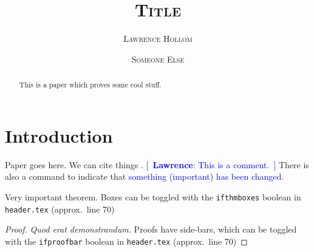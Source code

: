 \documentclass[reqno,a4paper,11pt]{article}
\newcommand{\lhc}[1]{\textcolor{blue}{[~\textbf{Lawrence}: #1~]}}
\newcommand{\lh}[1]{\textcolor{blue}{#1}}
\begin{document}
\title{\textsc{\bfseries Title}}

\renewcommand{\thefootnote}{\fnsymbol{footnote}}

\author{\textsc{Lawrence Hollom}\footnotemark[1] \and \textsc{Someone Else}\footnotemark[2]}


\renewcommand{\thefootnote}{\arabic{footnote}}

\date{}

\maketitle

\begin{abstract}
  This is a paper which proves some cool stuff.
\end{abstract}



\section{Introduction}
\label{sec:intro}

Paper goes here.
We can cite things \cite{Euc00}.
\lhc{This is a comment.}
There is also a command to indicate that \lh{something (important) has been changed}.

\begin{theorem}
	Very important theorem. Boxes can be toggled with the \texttt{ifthmboxes} boolean in \texttt{header.tex} (approx.\ line 70)
\end{theorem}

\begin{proof}
	\textit{Quod erat demonstrandum.} Proofs have side-bars, which can be toggled with the \texttt{ifproofbar} boolean in \texttt{header.tex} (approx.\ line 70)
\end{proof}


  
\renewcommand{\bibname}{Bibliography}


\end{document}
